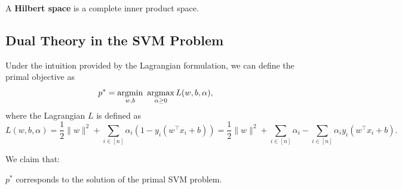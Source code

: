 \documentclass[../main]{subfiles}
\begin{document}
\begin{definition}
    \label{def:3.4}
    A \textbf{Hilbert space} is a complete inner product space.  
\end{definition}

\subsection{Dual Theory in the SVM Problem}

Under the intuition provided by the Lagrangian formulation, we can define the primal objective as
\begin{equation}
    p^* = \mathop{\mathrm{argmin}}_{w,b}\ \mathop{\mathrm{argmax}}_{\alpha \ge 0} L(w,b,\alpha),
\end{equation}
where the Lagrangian $L$ is defined as
\begin{equation}
    L(w,b,\alpha)
    = \frac{1}{2}\|w\|^2
    + \sum_{i \in [n]} \alpha_i (1 - y_i(w^\top x_i + b))
    = \frac{1}{2}\|w\|^2
    + \sum_{i \in [n]} \alpha_i
    - \sum_{i \in [n]} \alpha_i y_i (w^\top x_i + b).
\end{equation}

We claim that:
\begin{proposition}
    $p^*$ corresponds to the solution of the primal SVM problem.
\end{proposition}
\end{document}
